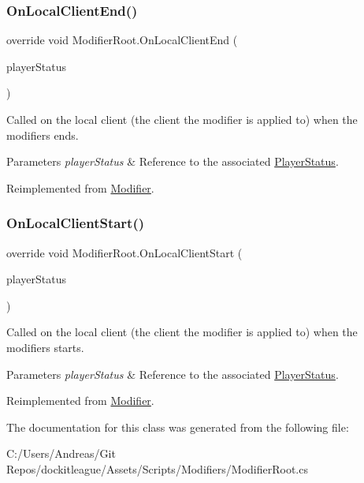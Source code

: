 \subsubsection{\texorpdfstring{On\+Local\+Client\+End()}{OnLocalClientEnd()}}
{\footnotesize\ttfamily override void Modifier\+Root.\+On\+Local\+Client\+End (\begin{DoxyParamCaption}\item[{\hyperlink{class_player_status}{Player\+Status}}]{player\+Status }\end{DoxyParamCaption})\hspace{0.3cm}{\ttfamily [virtual]}}



Called on the local client (the client the modifier is applied to) when the modifiers ends. 


\begin{DoxyParams}{Parameters}
{\em player\+Status} & Reference to the associated \hyperlink{class_player_status}{Player\+Status}.\\
\hline
\end{DoxyParams}


Reimplemented from \hyperlink{class_modifier_a1ea2aa04b05628c1965570396e390281}{Modifier}.

\hypertarget{class_modifier_root_a4905c6533e50d82cb9ffad1eda6c076e}{}\label{class_modifier_root_a4905c6533e50d82cb9ffad1eda6c076e} 
\subsubsection{\texorpdfstring{On\+Local\+Client\+Start()}{OnLocalClientStart()}}
{\footnotesize\ttfamily override void Modifier\+Root.\+On\+Local\+Client\+Start (\begin{DoxyParamCaption}\item[{\hyperlink{class_player_status}{Player\+Status}}]{player\+Status }\end{DoxyParamCaption})\hspace{0.3cm}{\ttfamily [virtual]}}



Called on the local client (the client the modifier is applied to) when the modifiers starts. 


\begin{DoxyParams}{Parameters}
{\em player\+Status} & Reference to the associated \hyperlink{class_player_status}{Player\+Status}.\\
\hline
\end{DoxyParams}


Reimplemented from \hyperlink{class_modifier_a5cce7ec6a5a595265a6bf5a6f7e40eb9}{Modifier}.



The documentation for this class was generated from the following file\+:\begin{DoxyCompactItemize}
\item 
C\+:/\+Users/\+Andreas/\+Git Repos/dockitleague/\+Assets/\+Scripts/\+Modifiers/Modifier\+Root.\+cs\end{DoxyCompactItemize}
